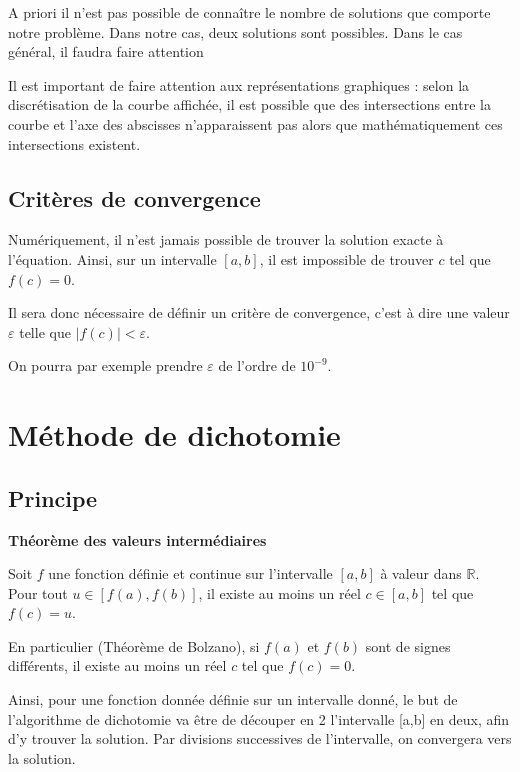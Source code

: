 \documentclass[10pt]{article}
\begin{document}
\begin{rem}
A priori il n'est pas possible de connaître le nombre de solutions que comporte notre problème. Dans notre cas, deux solutions sont possibles. Dans le cas général, il faudra faire attention 
\end{rem}

\begin{warn}
Il est important de faire attention aux représentations graphiques : selon la discrétisation de la courbe affichée, il est possible que des intersections entre la courbe et l'axe des abscisses n'apparaissent pas alors que mathématiquement ces intersections existent. 
\end{warn}

\subsection{Critères de convergence}

Numériquement, il n'est jamais possible de trouver la solution exacte à l'équation. Ainsi, sur un intervalle $[a,b]$, il est impossible de trouver $c$ tel que $f(c)=0$.

Il sera donc nécessaire de définir un critère de convergence, c'est à dire une valeur $\varepsilon$ telle que $|f(c)|<\varepsilon$.

On pourra par exemple prendre $\varepsilon$ de l'ordre de $10^{-9}$.

\section{Méthode de dichotomie}

\subsection{Principe}
\begin{theo}
\textbf{Théorème des valeurs intermédiaires}

Soit $f$ une fonction définie et continue sur l'intervalle $[a,b]$ à valeur dans $\mathbb{R}$. Pour tout $u\in[f(a),f(b)]$, il existe au moins un réel $c\in [a,b]$  tel que $f(c)=u$.

 En particulier (Théorème de Bolzano), si $f(a)$ et $f(b)$ sont de signes différents, il existe au moins un réel $c$ tel que $f(c)=0$. 
\end{theo}

Ainsi, pour une fonction donnée définie sur un intervalle donné, le but de l'algorithme de dichotomie va être de découper en 2 l'intervalle [a,b] en deux, afin d'y trouver la solution. Par divisions successives de l'intervalle, on convergera vers la solution.
\end{document}
